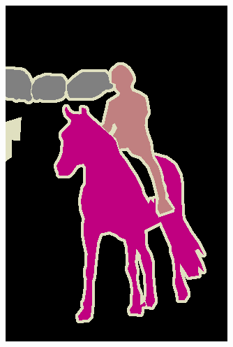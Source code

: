 \documentclass{article} %
\begin{document}
\begin{figure}[t]
\begin{subfigure}[b]{0.19\linewidth}
    \includegraphics[width=\textwidth]{figs/ab/gt/2007_005331}
  \end{subfigure}


\end{figure}
\end{document}
